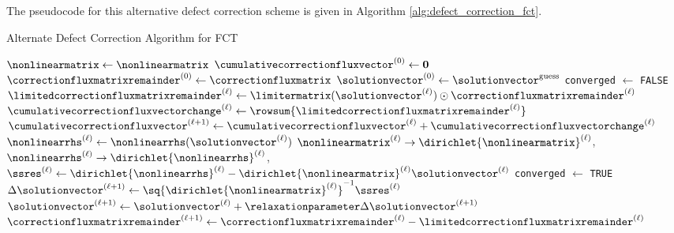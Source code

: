 The pseudocode for this alternative defect correction scheme is given
in Algorithm \ref{alg:defect_correction_fct}.

\begin{algorithm}[H]
\caption{Alternate Defect Correction Algorithm for FCT}
\label{alg:defect_correction_fct}
\begin{algorithmic}
\State $\nonlinearmatrix \gets \nonlinearmatrix$
\State $\cumulativecorrectionfluxvector^{(0)} \gets \mathbf{0}$
\State $\correctionfluxmatrixremainder^{(0)} \gets \correctionfluxmatrix$
\State $\solutionvector^{(0)} \gets \solutionvector^{\text{guess}}$
\State \texttt{converged} $\gets$ \texttt{FALSE}
  \State $\limitedcorrectionfluxmatrixremainder^{(\ell)} \gets
    \limitermatrix(\solutionvector^{(\ell)})\odot
    \correctionfluxmatrixremainder^{(\ell)}$
  \State $\cumulativecorrectionfluxvectorchange^{(\ell)} \gets
    \rowsum{\limitedcorrectionfluxmatrixremainder^{(\ell)}}$
  \State $\cumulativecorrectionfluxvector^{(\ell+1)} \gets
    \cumulativecorrectionfluxvector^{(\ell)}
    + \cumulativecorrectionfluxvectorchange^{(\ell)}$
  \State $\nonlinearrhs^{(\ell)} \gets
    \nonlinearrhs(\solutionvector^{(\ell)})$
  \State $\nonlinearmatrix^{(\ell)} \rightarrow
    \dirichlet{\nonlinearmatrix}^{(\ell)}$,
    $\nonlinearrhs^{(\ell)} \rightarrow \dirichlet{\nonlinearrhs}^{(\ell)}$,
  \State $\ssres^{(\ell)} \gets \dirichlet{\nonlinearrhs}^{(\ell)}
    - \dirichlet{\nonlinearmatrix}^{(\ell)}\solutionvector^{(\ell)}$
    \State \texttt{converged} $\gets$ \texttt{TRUE}
    \Break
  \EndIf
  \State $\Delta\solutionvector^{(\ell+1)}
    \gets \sq{\dirichlet{\nonlinearmatrix}^{(\ell)}}^{-1}\ssres^{(\ell)}$
  \State $\solutionvector^{(\ell+1)} \gets \solutionvector^{(\ell)}
    + \relaxationparameter\Delta\solutionvector^{(\ell+1)}$
  \State $\correctionfluxmatrixremainder^{(\ell+1)} \gets 
    \correctionfluxmatrixremainder^{(\ell)}
    - \limitedcorrectionfluxmatrixremainder^{(\ell)}$
\EndFor
{}
\EndIf
\end{algorithmic}
\end{algorithm}
